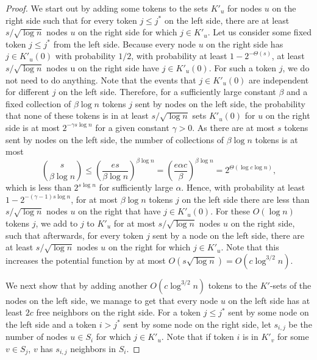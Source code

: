 \documentclass{llncs}
\begin{document}
\begin{proof}
    We start out by adding some tokens to the sets $K'_u$ for nodes
    $u$ on the right side such that for every token $j\leq j^*$ on the
    left side, there are at least $s/\sqrt{\log n}$ nodes $u$ on the
    right side for which $j\in K'_u$. Let us consider some fixed token
    $j\leq j^*$ from the left side. Because every node $u$ on the
    right side has $j\in K'_u(0)$ with probability $1/2$, with
    probability at least $1 - 2^{-\Theta(s)}$, at least $s/\sqrt{\log
        n}$ nodes u on the right side have $j\in K'_u(0)$. For such a
    token $j$, we do not need to do anything. Note that the events
    that $j\in K'_u(0)$ are independent for different $j$ on the left
    side. Therefore, for a sufficiently large constant $\beta$ and a
    fixed collection of $\beta\log n$ tokens $j$ sent by nodes on the
    left side, the probability that none of these tokens is in at
    least $s/\sqrt{\log n}$ sets $K'_u(0)$ for $u$ on the right side
    is at most $2^{-\gamma s\log n}$ for a given constant
    $\gamma>0$. As there are at most $s$ tokens sent by nodes on the
    left side, the number of collections of $\beta\log n$ tokens is at
    most
    \[
    {s\choose \beta\log n} \leq 
    \left(\frac{es}{\beta\log n}\right)^{\beta\log n} =
    \left(\frac{e\alpha c}{\beta}\right)^{\beta\log n} =
    2^{\Theta(\log c \log n)},
    \]
    which is less than $2^{s\log n}$ for sufficiently large
    $\alpha$. Hence, with probability at least $1-2^{-(\gamma-1)s\log n}$, for
    at most $\beta\log n$ tokens $j$ on the left side there are less
    than $s/\sqrt{\log n}$ nodes $u$ on the right that have $j\in
    K'_u(0)$.  For these $O(\log n)$ tokens $j$, we add to $j$ to
    $K'_u$ for at most $s/\sqrt{\log n}$ nodes $u$ on the right side,
    such that afterwards, for every token $j$ sent by a node on the
    left side, there are at least $s/\sqrt{\log n}$ nodes $u$ on the
    right for which $j\in K'_u$. Note that this increases the
    potential function by at most $O(s\sqrt{\log n}) =
    O(c\log^{3/2}n)$.

    We next show that by adding another $O(c\log^{3/2}n)$ tokens to
    the $K'$-sets of the nodes on the left side, we manage to get that
    every node $u$ on the left side has at least $2c$ free neighbors
    on the right side. For a token $j\leq j^*$ sent by some node  on
    the left side and a token $i>j^*$ sent by some node  on the right
    side, let $s_{i,j}$ be the number of nodes $u\in S_i$ for which
    $j\in K'_u$. Note that if token $i$ is in $K'_v$ for some $v\in
    S_j$, $v$ has $s_{i,j}$ neighbors in $S_i$.


\end{proof}
\end{document}
